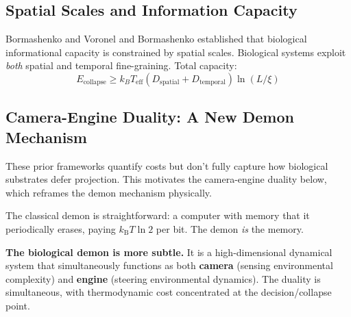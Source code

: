 \documentclass[12pt]{article}
\numberwithin{equation}{section}
\newcommand{\kB}{k_{\mathrm{B}}}
\begin{document}
\subsection{Spatial Scales and Information Capacity}

Bormashenko and Voronel \cite{voronel2018} and Bormashenko \cite{bormashenko2022} established that biological informational capacity is constrained by spatial scales. Biological systems exploit \emph{both} spatial and temporal fine-graining. Total capacity:
\begin{equation}
E_{\text{collapse}} \geq k_BT_{\text{eff}} (D_{\text{spatial}} + D_{\text{temporal}}) \ln(L/\xi)
\end{equation}

\subsection{Camera-Engine Duality: A New Demon Mechanism}

These prior frameworks quantify costs but don't fully capture how biological substrates defer projection. This motivates the camera-engine duality below, which reframes the demon mechanism physically.

The classical demon is straightforward: a computer with memory that it periodically erases, paying $\kB T\ln 2$ per bit. The demon \emph{is} the memory.

\textbf{The biological demon is more subtle.} It is a high-dimensional dynamical system that simultaneously functions as both \textbf{camera} (sensing environmental complexity) and \textbf{engine} (steering environmental dynamics). The duality is simultaneous, with thermodynamic cost concentrated at the decision/collapse point.
\end{document}
